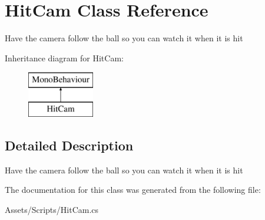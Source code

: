 \hypertarget{class_hit_cam}{}\section{Hit\+Cam Class Reference}
\label{class_hit_cam}


Have the camera follow the ball so you can watch it when it is hit  


Inheritance diagram for Hit\+Cam\+:\begin{figure}[H]
\begin{center}
\leavevmode
\includegraphics[height=2.000000cm]{class_hit_cam}
\end{center}
\end{figure}


\subsection{Detailed Description}
Have the camera follow the ball so you can watch it when it is hit 



The documentation for this class was generated from the following file\+:\begin{DoxyCompactItemize}
\item 
Assets/\+Scripts/Hit\+Cam.\+cs\end{DoxyCompactItemize}
